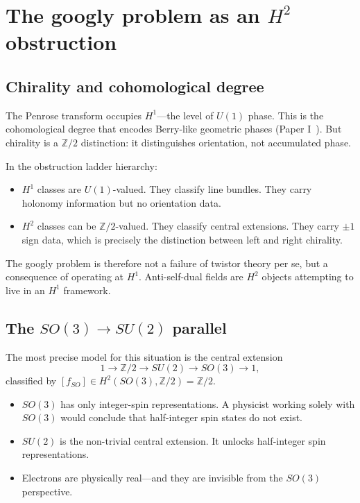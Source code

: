 \documentclass[11pt,a4paper]{article}
\theoremstyle{remark}
\newcommand{\Z}{\mathbb{Z}}
\begin{document}
\section{The googly problem as an $H^2$ obstruction}
\label{sec:googly-h2}

\subsection{Chirality and cohomological degree}

The Penrose transform occupies $H^1$---the level of $U(1)$ phase.
This is the cohomological degree that encodes Berry-like geometric
phases (Paper I~\cite{PaperI}). But chirality is a $\Z/2$ distinction:
it distinguishes orientation, not accumulated phase.

In the obstruction ladder hierarchy:
\begin{itemize}
  \item $H^1$ classes are $U(1)$-valued. They classify line bundles.
    They carry holonomy information but no orientation data.
  \item $H^2$ classes can be $\Z/2$-valued. They classify central
    extensions. They carry $\pm 1$ sign data, which is precisely
    the distinction between left and right chirality.
\end{itemize}

The googly problem is therefore not a failure of twistor theory per
se, but a consequence of operating at $H^1$. Anti-self-dual fields
are $H^2$ objects attempting to live in an $H^1$ framework.

\subsection{The $SO(3) \to SU(2)$ parallel}

The most precise model for this situation is the central extension
\[
  1 \to \Z/2 \to SU(2) \to SO(3) \to 1,
\]
classified by $[f_{SO}] \in H^2(SO(3), \Z/2) = \Z/2$.

\begin{itemize}
  \item $SO(3)$ has only integer-spin representations. A physicist
    working solely with $SO(3)$ would conclude that half-integer
    spin states do not exist.
  \item $SU(2)$ is the non-trivial central extension. It unlocks
    half-integer spin representations.
  \item Electrons are physically real---and they are invisible from
    the $SO(3)$ perspective.
\end{itemize}
\end{document}
